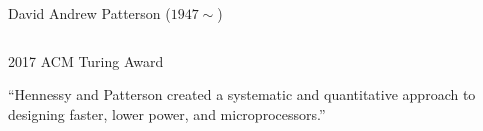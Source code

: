 \begin{frame}{}
  \begin{columns}
      \begin{center}
        David Andrew Patterson ($1947 \sim$)
      \end{center}
  \end{columns}
\end{frame}

\begin{frame}{}
  \begin{center}
    2017 ACM Turing Award
  \end{center}

  \vspace{0.60cm}
  \begin{center}
    ``Hennessy and Patterson created a systematic and quantitative approach
    to designing faster, lower power,
    and  microprocessors.''
  \end{center}
\end{frame}

\begin{frame}{}
  \begin{columns}
  \end{columns}
\end{frame}

\begin{frame}{}
\end{frame}

\begin{frame}{}
\end{frame}

